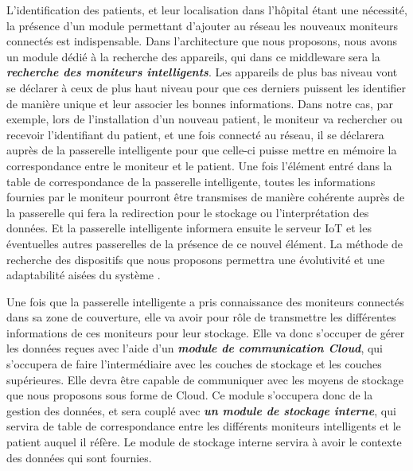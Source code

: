 L’identification des patients, et leur localisation dans l’hôpital étant une nécessité, la présence d’un module permettant d’ajouter au réseau les nouveaux moniteurs connectés est indispensable. Dans l’architecture que nous proposons, nous avons un module dédié à la recherche des appareils, qui dans ce middleware sera la \textbf{\textit{recherche des moniteurs intelligents}}. Les appareils de plus bas niveau vont se déclarer à ceux de plus haut niveau pour que ces derniers puissent les identifier de manière unique et leur associer les bonnes informations. Dans notre cas, par exemple, lors de l’installation d’un nouveau patient, le moniteur va rechercher ou recevoir l’identifiant du patient, et une fois connecté au réseau, il se déclarera auprès de la passerelle intelligente pour que celle-ci puisse mettre en mémoire la correspondance entre le moniteur et le patient. Une fois l’élément entré dans la table de correspondance de la passerelle intelligente, toutes les informations fournies par le moniteur pourront être transmises de manière cohérente auprès de la passerelle qui fera la redirection pour le stockage ou l’interprétation des données. Et la passerelle intelligente informera ensuite le serveur IoT et les éventuelles autres passerelles de la présence de ce nouvel élément. La méthode de recherche des dispositifs que nous proposons permettra une évolutivité et une adaptabilité aisées du système \cite{li2015iot}.

Une fois que la passerelle intelligente a pris connaissance des moniteurs connectés dans sa zone de couverture, elle va avoir pour rôle de transmettre les différentes informations de ces moniteurs pour leur stockage. Elle va donc s’occuper de gérer les données reçues avec l’aide d’un \textbf{\textit{module de communication Cloud}}, qui s’occupera de faire l’intermédiaire avec les couches de stockage et les couches supérieures. Elle devra être capable de communiquer avec les moyens de stockage que nous proposons sous forme de Cloud. Ce module s’occupera donc de la gestion des données, et sera couplé avec \textbf{\textit{un module de stockage interne}}, qui servira de table de correspondance entre les différents moniteurs intelligents et le patient auquel il réfère. Le module de stockage interne servira à avoir le contexte des données qui sont fournies.

